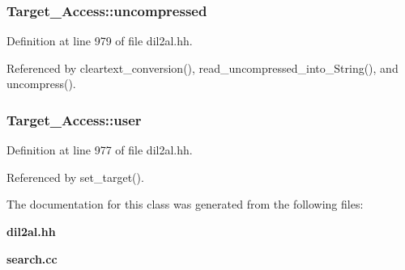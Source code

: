 \subsubsection{ Target\_\-Access::uncompressed\hspace{0.3cm}{\tt  [protected]}}\label{classTarget__Access_n6}




Definition at line 979 of file dil2al.hh.

Referenced by cleartext\_\-conversion(), read\_\-uncompressed\_\-into\_\-String(), and uncompress().
\subsubsection{ Target\_\-Access::user\hspace{0.3cm}{\tt  [protected]}}\label{classTarget__Access_n1}




Definition at line 977 of file dil2al.hh.

Referenced by set\_\-target().

The documentation for this class was generated from the following files:\begin{CompactItemize}
\item 
{\bf dil2al.hh}\item 
{\bf search.cc}\end{CompactItemize}
